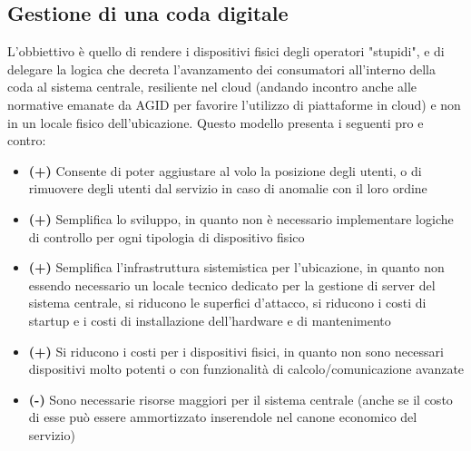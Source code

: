 \documentclass[a4paper, titlepage, 12pt, openright, twoside]{book}
\begin{document}
\subsection{Gestione di una coda digitale}
L'obbiettivo è quello di rendere i dispositivi fisici degli operatori "stupidi", e di delegare la logica che decreta l'avanzamento dei consumatori all'interno della coda al sistema centrale, resiliente nel cloud (andando incontro anche alle normative emanate da AGID per favorire l'utilizzo di piattaforme in cloud) e non in un locale fisico dell'ubicazione.
Questo modello presenta i seguenti pro e contro:
\begin{itemize}
	\item \textbf{(+)} Consente di poter aggiustare al volo la posizione degli utenti, o di rimuovere degli utenti dal servizio in caso di anomalie con il loro ordine
	\item \textbf{(+)} Semplifica lo sviluppo, in quanto non è necessario implementare logiche di controllo per ogni tipologia di dispositivo fisico
	\item \textbf{(+)} Semplifica l'infrastruttura sistemistica per l'ubicazione, in quanto non essendo necessario un locale tecnico dedicato per la gestione di server del sistema
					   centrale, si riducono le superfici d'attacco, si riducono i costi di startup e i costi di installazione dell'hardware e di mantenimento
	\item \textbf{(+)} Si riducono i costi per i dispositivi fisici, in quanto non sono necessari dispositivi molto potenti o con funzionalità di calcolo/comunicazione avanzate
	\item \textbf{(-)} Sono necessarie risorse maggiori per il sistema centrale (anche se il costo di esse può essere ammortizzato inserendole nel canone economico del servizio)
\end{itemize}
\end{document}
